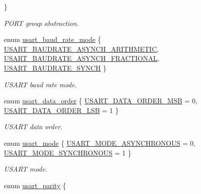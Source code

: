 \begin{DoxyCompactItemize}
 \}\begin{DoxyCompactList}\small\item\em P\+O\+RT group abstraction. \end{DoxyCompactList}
\item 
enum \hyperlink{group___h_p_l_ga59141b5eb86f4d53f17bbeab1d7c83e7}{usart\+\_\+baud\+\_\+rate\+\_\+mode} \{ \hyperlink{group___h_p_l_gga59141b5eb86f4d53f17bbeab1d7c83e7a9dfbfc309d416d0a7133146b967aff12}{U\+S\+A\+R\+T\+\_\+\+B\+A\+U\+D\+R\+A\+T\+E\+\_\+\+A\+S\+Y\+N\+C\+H\+\_\+\+A\+R\+I\+T\+H\+M\+E\+T\+IC}, 
\hyperlink{group___h_p_l_gga59141b5eb86f4d53f17bbeab1d7c83e7a88eeba612b4bb837118d0b58fb362154}{U\+S\+A\+R\+T\+\_\+\+B\+A\+U\+D\+R\+A\+T\+E\+\_\+\+A\+S\+Y\+N\+C\+H\+\_\+\+F\+R\+A\+C\+T\+I\+O\+N\+AL}, 
\hyperlink{group___h_p_l_gga59141b5eb86f4d53f17bbeab1d7c83e7a6ea0c41087b56d5b6111bc75c7fa4fce}{U\+S\+A\+R\+T\+\_\+\+B\+A\+U\+D\+R\+A\+T\+E\+\_\+\+S\+Y\+N\+CH}
 \}\begin{DoxyCompactList}\small\item\em U\+S\+A\+RT baud rate mode. \end{DoxyCompactList}
\item 
enum \hyperlink{group___h_p_l_ga426849bbd9655cec091101ebc9123eb4}{usart\+\_\+data\+\_\+order} \{ \hyperlink{group___h_p_l_gga426849bbd9655cec091101ebc9123eb4afd8bb97c0b2a548d9e3cb9b55e78c4bd}{U\+S\+A\+R\+T\+\_\+\+D\+A\+T\+A\+\_\+\+O\+R\+D\+E\+R\+\_\+\+M\+SB} = 0, 
\hyperlink{group___h_p_l_gga426849bbd9655cec091101ebc9123eb4a88ca2528623acb9433729123f12f5518}{U\+S\+A\+R\+T\+\_\+\+D\+A\+T\+A\+\_\+\+O\+R\+D\+E\+R\+\_\+\+L\+SB} = 1
 \}\begin{DoxyCompactList}\small\item\em U\+S\+A\+RT data order. \end{DoxyCompactList}
\item 
enum \hyperlink{group___h_p_l_ga1c465965478e0f6908a4c99d4f3ad20f}{usart\+\_\+mode} \{ \hyperlink{group___h_p_l_gga1c465965478e0f6908a4c99d4f3ad20fa15ae875c7e7097405cb441a311d6a4d8}{U\+S\+A\+R\+T\+\_\+\+M\+O\+D\+E\+\_\+\+A\+S\+Y\+N\+C\+H\+R\+O\+N\+O\+US} = 0, 
\hyperlink{group___h_p_l_gga1c465965478e0f6908a4c99d4f3ad20fa004992ac327040dfff2102581111a7e9}{U\+S\+A\+R\+T\+\_\+\+M\+O\+D\+E\+\_\+\+S\+Y\+N\+C\+H\+R\+O\+N\+O\+US} = 1
 \}\begin{DoxyCompactList}\small\item\em U\+S\+A\+RT mode. \end{DoxyCompactList}
\item 
enum \hyperlink{group___h_p_l_ga867cc5f0ea7d3bf651d68f0046cf6f41}{usart\+\_\+parity} \{ \newline

\end{DoxyCompactItemize}
